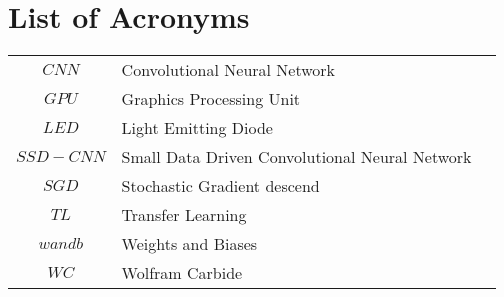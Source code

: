 \chapter*{List of Acronyms}

\begin{table}[!h]
	\begin{tabular}{cll}
		$CNN$ & Convolutional Neural Network \\
		$GPU$ & Graphics Processing Unit \\
		$LED$ & Light Emitting Diode\\
		$SSD-CNN$ & Small Data Driven Convolutional Neural Network \\
		$SGD$ & Stochastic Gradient descend \\
		$TL$ & Transfer Learning \\
		$wandb$ & Weights and Biases \\
		$WC$ & Wolfram Carbide \\
		
	\end{tabular}
\end{table}